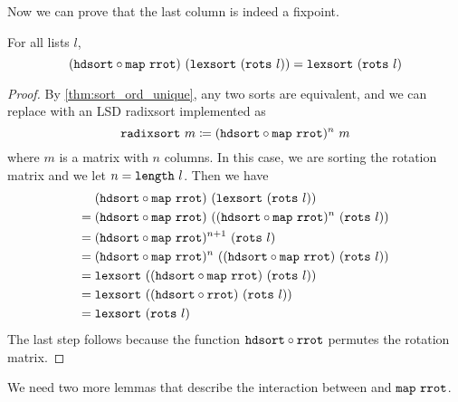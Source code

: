 \documentclass[sigplan,10pt,anonymous,review]{thesis}
\begin{document}
Now we can prove that the last column is indeed a fixpoint.
\begin{theorem}
  For all lists $l$,
  \begin{equation*}
    (\texttt{\textup{hdsort}} \circ
    \texttt{\textup{map}}~\texttt{\textup{rrot}})~(\texttt{\textup{lexsort}}~(\texttt{\textup{rots}}~l)) =
    \texttt{\textup{lexsort}}~(\texttt{\textup{rots}}~l)
  \end{equation*}
\end{theorem}
\begin{proof}
  By \cref{thm:sort_ord_unique}, any two sorts are equivalent, and we
  can replace  with an LSD radixsort implemented as
  \begin{equation*}
    \texttt{\textup{radixsort}}~m \coloneqq (\texttt{\textup{hdsort}} \circ \texttt{\textup{map}}~\texttt{\textup{rrot}})^n~m
  \end{equation*}
  where $m$ is a matrix with $n$ columns. In this case, we are sorting
  the rotation matrix and we let $n = \texttt{\textup{length}}~l$. Then we have
  \begin{align*}
       &(\texttt{\textup{hdsort}} \circ \texttt{\textup{map}}~\texttt{\textup{rrot}})~(\texttt{\textup{lexsort}}~(\texttt{\textup{rots}}~l)) \\
    ={}&(\texttt{\textup{hdsort}} \circ \texttt{\textup{map}}~\texttt{\textup{rrot}})~((\texttt{\textup{hdsort}} \circ \texttt{\textup{map}}~\texttt{\textup{rrot}})^n~(\texttt{\textup{rots}}~l)) \\
    ={}&(\texttt{\textup{hdsort}} \circ \texttt{\textup{map}}~\texttt{\textup{rrot}})^{n+1}~(\texttt{\textup{rots}}~l) \\
    ={}&(\texttt{\textup{hdsort}} \circ \texttt{\textup{map}}~\texttt{\textup{rrot}})^n~((\texttt{\textup{hdsort}} \circ \texttt{\textup{map}}~\texttt{\textup{rrot}})~(\texttt{\textup{rots}}~l)) \\
    ={}&\texttt{\textup{lexsort}}~((\texttt{\textup{hdsort}} \circ \texttt{\textup{map}}~\texttt{\textup{rrot}})~(\texttt{\textup{rots}}~l)) \\
    ={}&\texttt{\textup{lexsort}}~((\texttt{\textup{hdsort}} \circ \texttt{\textup{rrot}})~(\texttt{\textup{rots}}~l)) \\
    ={}&\texttt{\textup{lexsort}}~(\texttt{\textup{rots}}~l)
  \end{align*}
  The last step follows because the function $\texttt{\textup{hdsort}} \circ
  \texttt{\textup{rrot}}$ permutes the rotation matrix.
\end{proof}

We need two more lemmas that describe the interaction between
 and $\texttt{\textup{map}}~\texttt{\textup{rrot}}$.
\end{document}
